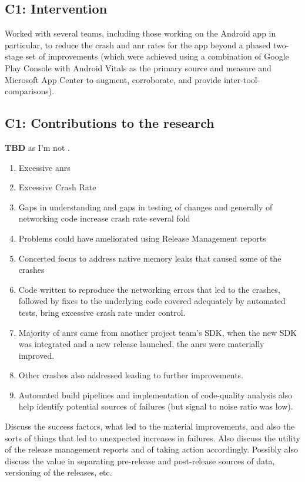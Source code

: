 \subsection{C1: Intervention}
Worked with several teams, including those working on the Android app in particular, to reduce the crash and \acrshort{anr} rates for the app beyond a phased two-stage set of improvements (which were achieved using a combination of Google Play Console with Android Vitals as the primary source and measure and Microsoft App Center to augment, corroborate, and provide inter-tool-comparisons).

\subsection{C1: Contributions to the research}
\textbf{TBD} as I'm not .

\begin{enumerate}
    \item Excessive \acrshort{anr}s
    \item Excessive Crash Rate
    \item Gaps in understanding and gaps in testing of changes and generally of networking code increase crash rate several fold
    \item Problems could have ameliorated using Release Management reports
    \item Concerted focus to address native memory leaks that caused some of the crashes
    \item Code written to reproduce the networking errors that led to the crashes, followed by fixes to the underlying code covered adequately by automated tests, bring excessive crash rate under control.
    \item Majority of \acrshort{anr}s came from another project team's SDK, when the new SDK was integrated and a new release launched, the \acrshort{anr}s were materially improved. 
    \item Other crashes also addressed leading to further improvements.
    \item Automated build pipelines and implementation of code-quality analysis also help identify potential sources of failures (but signal to noise ratio was low).
\end{enumerate}

Discuss the success factors, what led to the material improvements, and also the sorts of things that led to unexpected increases in failures. Also discuss the utility of the release management reports and of taking action accordingly. Possibly also discuss the value in separating pre-release and post-release sources of data, versioning of the releases, etc.


